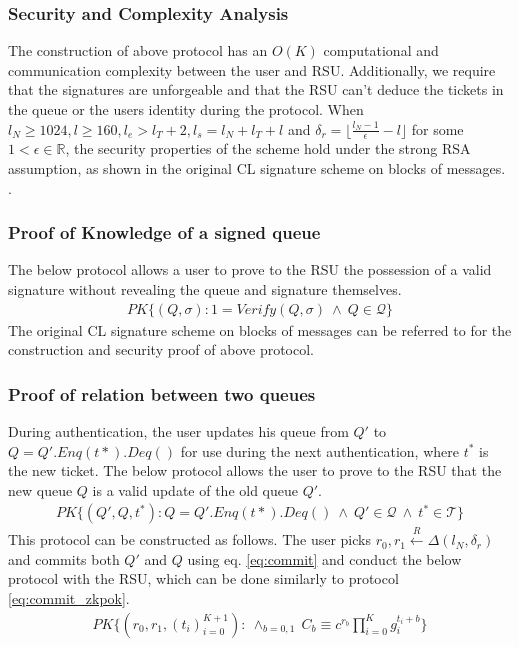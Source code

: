 \documentclass[12pt]{article}
\newcommand{\rIn}{\xleftarrow{R}}
\newcommand{\PK}[2]{\ensuremath{PK\{(#1): #2\}}}
\begin{document}
\subsubsection{Security and Complexity Analysis}
The construction of above protocol has an $O(K)$ computational and communication complexity between the user and RSU. Additionally, we require that the signatures are unforgeable and that the RSU can't deduce the tickets in the queue or the users identity during the protocol. When $l_N \geq 1024, l \geq 160, l_e > l_T + 2, l_s = l_N + l_T + l$ and $ \delta_r = \lfloor \frac{l_N - 1}{\epsilon} - l \rfloor$ for some $1 < \epsilon \in \mathbb{R}$, the security properties of the scheme hold under the strong RSA assumption, as shown in the original CL signature scheme on blocks of messages. \cite*{CL}.

\subsubsection{Proof of Knowledge of a signed queue}
The below protocol allows a user to prove to the RSU the possession of a valid signature without revealing the queue and signature themselves.
\begin{align}
	\PK{Q, \sigma}{1 = Verify(Q, \sigma) \ \land\ Q \in \mathcal{Q}}
\end{align}
The original CL signature scheme on blocks of messages \cite*{CL} can be referred to for the construction and security proof of above protocol.

\subsubsection{Proof of relation between two queues}
During authentication, the user updates his queue from $Q'$ to $Q = Q'.Enq(t*).Deq()$ for use during the next authentication, where $t^*$ is the new ticket. The below protocol allows the user to prove to the RSU that the new queue $Q$ is a valid update of the old queue $Q'$.
\begin{align}
	\PK{Q', Q, t^*}{Q = Q'.Enq(t*).Deq() \ \land\ Q' \in \mathcal{Q} \ \land\ t^* \in \mathcal{T}}
\end{align}
This protocol can be constructed as follows. The user picks $r_0, r_1 \rIn \Delta(l_N, \delta_r)$ and commits both $Q'$ and $Q$ using eq. \ref{eq:commit} and conduct the below protocol with the RSU, which can be done similarly to protocol \ref{eq:commit_zkpok}.
\begin{align}
	\PK{r_0, r_1, (t_i)_{i=0}^{K+1}}{\ \land_{b=0,1}\ C_b \equiv c^{r_b} \prod_{i=0}^{K} g_i^{t_i+b}}
\end{align}
\end{document}
